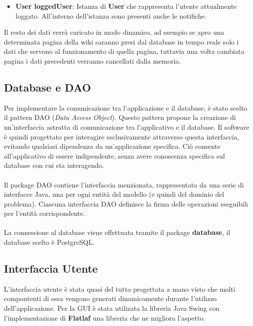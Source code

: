 \documentclass{article}
\begin{document}
	\begin{itemize}
		\item \textbf{User loggedUser}: Istanza di \textbf{User} che rappresenta l'utente attualmente loggato. All'interno dell'istanza sono presenti anche le notifiche.
	\end{itemize}
	
	Il resto dei dati verr\`a caricato in modo dinamico, ad esempio se apro una determinata pagina della wiki saranno presi dal database in tempo reale solo i dati che servono al funzionamento di quella pagina, tuttavia una volta cambiata pagina i dati precedenti verranno cancellati dalla memoria.


	\subsection{Database e DAO}
	Per implementare la comunicazione tra l'applicazione e il database, è stato scelto il pattern DAO (\textit{Data Access Object}). Questo pattern propone la creazione di un'interfaccia astratta di comunicazione tra l'applicativo e il database. Il software è quindi progettato per interagire esclusivamente attraverso questa interfaccia, evitando qualsiasi dipendenza da un'applicazione specifica. Ciò consente all'applicativo di essere indipendente, senza avere conoscenza specifica sul database con cui sta interagendo.
	\\\\
	Il package DAO contiene l'interfaccia menzionata, rappresentata da una serie di interfacce Java, una per ogni entità del modello (e quindi del dominio del problema). Ciascuna interfaccia DAO definisce la firma delle operazioni eseguibili per l'entità corrispondente.
	\\\\
	La connessione al database viene effettuata tramite il package \textbf{database}, il database scelto \`e PostgreSQL.
	
	\subsection{Interfaccia Utente}
	L'interfaccia utente \`e stata quasi del tutto progettata a mano visto che molti compontenti di essa vengono generati dinamicamente durante l'utilizzo dell'applicazione. Per la GUI \`e stata utilizata la libreria Java Swing con l'implementazione di \textbf{Flatlaf} una libreria che ne migliora l'aspetto.

	\newpage
\end{document}
